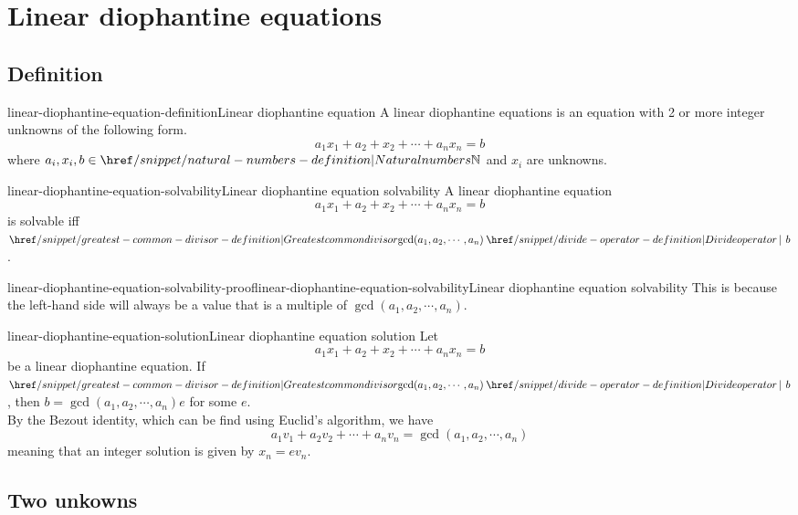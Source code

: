 \documentclass[preview]{standalone}
\begin{document}
\genpage

\section{Linear diophantine equations}

\subsection{Definition}

\begin{snippetdefinition}{linear-diophantine-equation-definition}{Linear diophantine equation}
    A linear diophantine equations is an equation with 2 or more integer unknowns of the following form.
    \[
        a_1x_1 + a_2+x_2 + \cdots + a_nx_n = b
    \]
    where \(a_i,x_i,b \in \naturalnumbers\) and \(x_i\) are unknowns.
\end{snippetdefinition}

\begin{snippetproposition}{linear-diophantine-equation-solvability}{Linear diophantine equation solvability}
    A linear diophantine equation
    \[
        a_1x_1 + a_2+x_2 + \cdots + a_nx_n = b
    \]
    is solvable iff \(\gcd(a_1,a_2,\cdots,a_n) \divides b\).
\end{snippetproposition}

\begin{snippetproof}{linear-diophantine-equation-solvability-proof}{linear-diophantine-equation-solvability}{Linear diophantine equation solvability}
    This is because the left-hand side will always be a value that is a multiple
    of \(\gcd(a_1,a_2,\cdots,a_n)\).
\end{snippetproof}

\begin{snippetproposition}{linear-diophantine-equation-solution}{Linear diophantine equation solution}
    Let
    \[
        a_1x_1 + a_2+x_2 + \cdots + a_nx_n = b
    \]
    be a linear diophantine equation.
    If \(\gcd(a_1,a_2,\cdots,a_n) \divides b\),
    then \(b = \gcd(a_1,a_2,\cdots,a_n)e\) for some \(e\). \\
    By the Bezout identity, which can be find using Euclid's algorithm, we have
    \[a_1v_1+a_2v_2+\cdots+a_nv_n=\gcd(a_1,a_2,\cdots,a_n)\]
    meaning that an integer solution is given by \(x_n=ev_n\).
\end{snippetproposition}

\subsection{Two unkowns}
\end{document}
